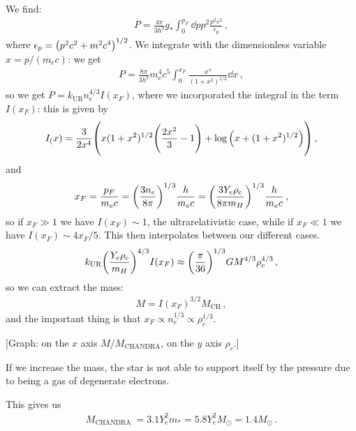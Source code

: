 \documentclass[main.tex]{subfiles}
\begin{document}
We find: 
%
\begin{align}
P = \frac{4 \pi }{3 h^3} g_{*} \int_{0}^{p_F} \dd{p} p^2 \frac{p^2 c^2}{\epsilon_{p}}
\,,
\end{align}
%
where \(\epsilon_{p} = \qty(p^2c^2 + m^2c^{4})^{1/2}\). We integrate with the dimensionless variable \(x = p / (m_e c)\): we get 
%
\begin{align}
P = \frac{8 \pi }{3 h^3} m_e^4 c^{5} \int_{0}^{x_F} \frac{x^{4}}{(1+x^2)^{1/2}} \dd{x}
\,,
\end{align}
%
so we get \(P = k _{\text{UR}} n_e^{4/3}I(x_F)\), where we incorporated the integral in the term \(I(x_F)\): this is given by 
%
\begin{align}
I_(x) = \frac{3}{2 x^{4}} \qty( x (1+x^2)^{1/2} \qty(\frac{2x^2}{3} -1) + \log \qty(x + (1+x^2)^{1/2}))
\,,
\end{align}
%
and 
%
\begin{align}
x_F = \frac{p_F}{m_ec} = 
\qty(\frac{3 n_e}{8 \pi })^{1/3} \frac{h}{m_e c} =
\qty(\frac{3 Y_e \rho_{c}}{8 \pi m_H})^{1/3} \frac{h}{m_e c}
\,,
\end{align}
%
so if \(x_F \gg 1\) we have \(I(x_F) \sim 1\), the ultrarelativistic case, while if \(x_F \ll 1\) we have \(I(x_F) \sim 4 x_F / 5\). 
This then interpolates between our different cases.  
%
\begin{align}
k _{\text{UR}} \qty(\frac{Y_e \rho_{c}}{m_H})^{4/3} I(x_F)
\approx \qty(\frac{\pi }{36})^{1/3} G M^{4/3} \rho_{c}^{4/3}
\,,
\end{align}
%
so we can extract the mass: 
%
\begin{align}
M = I(x_F)^{3/2} M _{\text{CH}}
\,,
\end{align}
%
and the important thing is that \(x_F \propto n_e^{1/3} \propto \rho_{c}^{1/3}\). 

[Graph: on the \(x\) axis \(M/ M _{\text{CHANDRA}}\), on the \(y \) axis \(\rho_{c}\).]

If we increase the mass, the star is not able to support itself by the pressure due to being a gas of degenerate electrons. 

This gives us 
%
\begin{align}
M _{\text{CHANDRA }} = 3.1 Y_e^2 m_{*}
= 5.8 Y_e^2 M_{\odot} = 1.4 M_{\odot}
\,.
\end{align}
\end{document}
